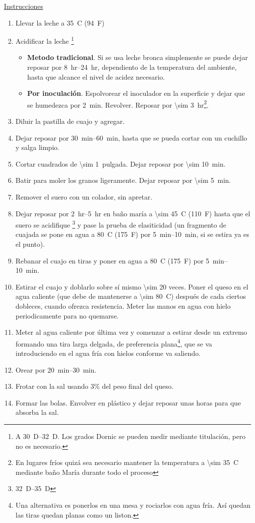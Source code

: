 \underline{Instrucciones}
\begin{enumerate}
\item Llevar la leche a \SI{35}{C} (\SI{94}{F})
\item Acidificar la leche \footnote{A \SIrange{30}{32}{D}. Los grados Dornic se pueden medir mediante titulación, pero no es necesario.} 
\begin{itemize}
\item \textbf{Metodo tradicional}. Si se usa leche bronca simplemente se puede dejar reposar por \SIrange{8}{24}{hr}, dependiento de la temperatura del ambiente, hasta que alcance el nivel de acidez necesario.
\item \textbf{Por inoculación}. Espolvorear el inoculador en la superficie y dejar que se humedezca por \SI{2}{min}. Revolver. Reposar por \SI{\sim 3}{hr}\footnote{En lugares fríos quizá sea necesario mantener la temperatura a \SI{\sim 35}{C} mediante baño María durante todo el proceso}.
\end{itemize}
\item Diluir la pastilla de cuajo y agregar.
\item Dejar reposar por \SIrange{30}{60}{min}, hasta que se pueda cortar con un cuchillo y salga limpio.
\item Cortar cuadrados de \SI{\sim 1}{pulgada}. Dejar reposar por \SI{\sim 10}{min}.
\item Batir para moler los granos ligeramente. Dejar reposar por \SI{\sim 5}{min}.
\item Remover el suero con un colador, sin apretar.
\item Dejar reposar por \SIrange{2}{5}{hr} en baño maría a \SI{\sim 45}{C} (\SI{110}{F}) hasta que el suero se acidifique \footnote{\SIrange{32}{35}{D}} y pase la prueba de elasiticidad (un fragmento de cuajada se pone en agua a \SI{80}{C} (\SI{175}{F}) por \SIrange{5}{10}{min}, si se estira ya es el punto).
\item Rebanar el cuajo en tiras y poner en agua a \SI{80}{C} (\SI{175}{F}) por  \SIrange{5}{10}{min}.
\item Estirar el cuajo y doblarlo sobre sí mismo \num{\sim 20} veces. Poner el queso en el agua caliente (que debe de mantenerse a \SI{\sim 80}{C}) después de cada ciertos dobleces, cuando ofrezca resistencia. Meter las manos en agua con hielo periodicamente para no quemarse.
\item Meter al agua caliente por última vez y comenzar a estirar desde un extremo formando una tira larga delgada, de preferencia plana\footnote{Una alternativa es ponerlos en una mesa y rociarlos con agua fría. Así quedan las tiras quedan planas como un liston.}, que se va introduciendo en el agua fría con hielos conforme va saliendo. 
\item Orear por \SIrange{20}{30}{min}.
\item Frotar con la sal usando 3\% del peso final del queso.
\item Formar las bolas. Envolver en plástico y dejar reposar unas horas para que absorba la sal.
\end{enumerate}
